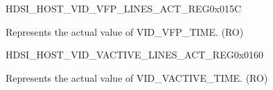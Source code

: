 \begin{register}{H}{DSI\_HOST\_VID\_VFP\_LINES\_ACT\_REG}{0x015C}\label{regdesc:DSIHOSTVIDVFPLINESACTREG}
%
%
\regnewline%
\begin{regdesc}\begin{reglist}
\label{fielddesc:DSIHOSTVFPLINESACT}\item [DSI\_HOST\_VFP\_LINES\_ACT] Represents the actual value of VID\_VFP\_TIME. (RO)
\end{reglist}\end{regdesc}
\end{register}


\begin{register}{H}{DSI\_HOST\_VID\_VACTIVE\_LINES\_ACT\_REG}{0x0160}\label{regdesc:DSIHOSTVIDVACTIVELINESACTREG}
%
%
\regnewline%
\begin{regdesc}\begin{reglist}
\label{fielddesc:DSIHOSTVACTIVELINESACT}\item [DSI\_HOST\_V\_ACTIVE\_LINES\_ACT] Represents the actual value of VID\_VACTIVE\_TIME. (RO)
\end{reglist}\end{regdesc}
\end{register}


